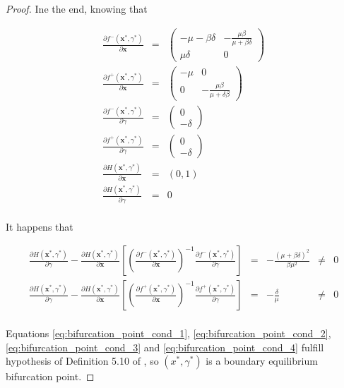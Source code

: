 \begin{proof}
Ine the end, knowing that 

\begin{equation}
    \begin{array}{ccc}
        \frac{\partial f^-(\textbf{x}^*,\gamma^*)}{\partial \textbf{x}} &=& \begin{pmatrix}
        -\mu-\beta\delta & -\frac{\mu\beta}{\mu+\beta\delta} \\
        \mu\delta & 0 \end{pmatrix} \\
        \frac{\partial f^+(\textbf{x}^*,\gamma^*)}{\partial \textbf{x}} &=& \begin{pmatrix}
        -\mu & 0 \\ 0 & -\frac{\mu\beta}{\mu+\delta\beta} \end{pmatrix} \\
        \frac{\partial f^-(\textbf{x}^*,\gamma^*)}{\partial\gamma} &=& \begin{pmatrix} 0 \\ -\delta \end{pmatrix} \\
        \frac{\partial f^+(\textbf{x}^*,\gamma^*)}{\partial\gamma} &=& \begin{pmatrix} 0 \\ -\delta \end{pmatrix} \\
        \frac{\partial H(\textbf{x}^*,\gamma^*)}{\partial \textbf{x}} &=& (0,1) \\
        \frac{\partial H(\textbf{x}^*,\gamma^*)}{\partial \gamma} &=& 0 \\
    \end{array}
\end{equation}

It happens that

\begin{equation}
\label{eq:bifurcation_point_cond_4}
    \begin{array}{ccccc}
        \frac{\partial H(\textbf{x}^*,\gamma^*)}{\partial \gamma} - \frac{\partial H(\textbf{x}^*,\gamma^*)}{\partial \textbf{x}} \left[\left(\frac{\partial f^-(\textbf{x}^*,\gamma^*)}{\partial\textbf{x}}\right)^{-1}\frac{\partial f^-(\textbf{x}^*,\gamma^*)}{\partial\gamma}
        \right] &=& -\frac{\left(\mu+\beta\delta\right)^2}{\beta\mu^2} & \neq & 0 \\
        \frac{\partial H(\textbf{x}^*,\gamma^*)}{\partial \gamma} - \frac{\partial H(\textbf{x}^*,\gamma^*)}{\partial \textbf{x}} \left[\left(\frac{\partial f^+(\textbf{x}^*,\gamma^*)}{\partial\textbf{x}}\right)^{-1}\frac{\partial f^+(\textbf{x}^*,\gamma^*)}{\partial\gamma}
        \right] &=& -\frac{\delta}{\mu} & \neq & 0 \\ 
    \end{array}
\end{equation}

Equations \ref{eq:bifurcation_point_cond_1}, \ref{eq:bifurcation_point_cond_2}, \ref{eq:bifurcation_point_cond_3} and \ref{eq:bifurcation_point_cond_4} fulfill hypothesis of Definition 5.10 of \cite[pp. 235]{bib:di_bernardo}, so $(x^*,\gamma^*)$ is a boundary equilibrium bifurcation point.

\end{proof}